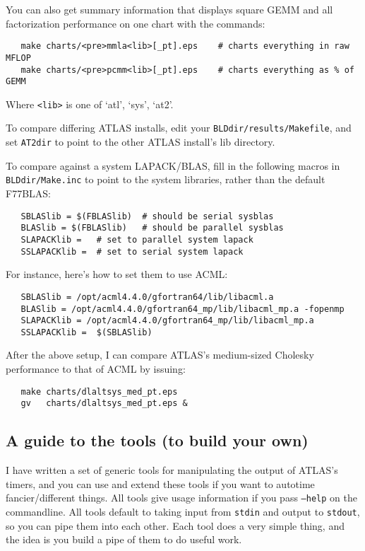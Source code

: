 \documentclass[11pt]{article}
\begin{document}
You can also get summary information that displays square GEMM and all
factorization performance on one chart with the commands:
\begin{verbatim}
   make charts/<pre>mmla<lib>[_pt].eps    # charts everything in raw MFLOP
   make charts/<pre>pcmm<lib>[_pt].eps    # charts everything as % of GEMM
\end{verbatim}
Where \verb+<lib>+ is one of `atl', `sys', `at2'.

To compare differing ATLAS installs, edit your {\tt BLDdir/results/Makefile},
and set {\tt AT2dir} to point to the other ATLAS install's lib directory.

{\samepage
To compare against a system LAPACK/BLAS, fill in the following macros in 
{\tt BLDdir/Make.inc} to point to the system libraries, rather than
the default F77BLAS:
\begin{verbatim}
   SBLASlib = $(FBLASlib)  # should be serial sysblas
   BLASlib = $(FBLASlib)   # should be parallel sysblas
   SLAPACKlib =   # set to parallel system lapack
   SSLAPACKlib =  # set to serial system lapack
\end{verbatim}
}

{\samepage
For instance, here's how to set them to use ACML:
\begin{verbatim}
   SBLASlib = /opt/acml4.4.0/gfortran64/lib/libacml.a
   BLASlib = /opt/acml4.4.0/gfortran64_mp/lib/libacml_mp.a -fopenmp
   SLAPACKlib = /opt/acml4.4.0/gfortran64_mp/lib/libacml_mp.a
   SSLAPACKlib =  $(SBLASlib)
\end{verbatim}
}

After the above setup, I can compare ATLAS's medium-sized Cholesky performance
to that of ACML by issuing:
\begin{verbatim}
   make charts/dlaltsys_med_pt.eps
   gv   charts/dlaltsys_med_pt.eps &
\end{verbatim}

\subsection{A guide to the tools (to build your own)}
I have written a set of generic tools for manipulating the output of
ATLAS's timers, and you can use and extend these tools if you want to
autotime fancier/different things.  All tools give usage information
if you pass {\tt --help} on the commandline.  All tools default to
taking input from {\tt stdin} and output to {\tt stdout}, so you can
pipe them into each other.  Each tool does a very simple thing, and
the idea is you build a pipe of them to do useful work.
\end{document}
